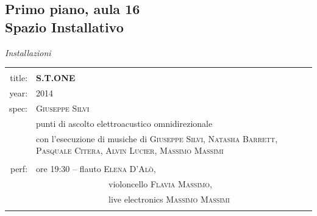 \documentclass[9pt, twoside, a5paper]{extreport}
\begin{document}
\subsection*{\textsf{Primo piano, aula 16\\
	{\small Spazio Installativo\\}}}

{\fontsize{30}{30}\selectfont \textit{Installazioni}}
\bigskip

\noindent
\begin{tabular}{r|p{10cm}}
								&			\\
\textsf{title:}					&			\textbf{S.T.ONE}						\\
\textsf{year:}					&			2014								\\
\textsf{spec:}					&			\textsc{Giuseppe Silvi} 				\\
								&			punti di ascolto elettroacustico omnidirezionale\\
								& 			con l’esecuzione di musiche di \textsc{Giuseppe Silvi}, \textsc{Natasha Barrett}, \textsc{Pasquale Citera}, \textsc{Alvin Lucier}, \textsc{Massimo Massimi}\\
					&			\\
\textsf{perf:}						& ore 19:30 -- flauto \textsc{Elena D'Alò},  \\
								& \ \ \ \ \ \ \ \ \ \ \ \ \ \ \ \ \ violoncello \textsc{Flavia Massimo},			\\
								& \ \ \ \ \ \ \ \ \ \ \ \ \ \ \ \ \ live electronics \textsc{Massimo Massimi}		\\
																								&			\\ %
\hline
\hline

\end{tabular}

\bigskip
\end{document}
